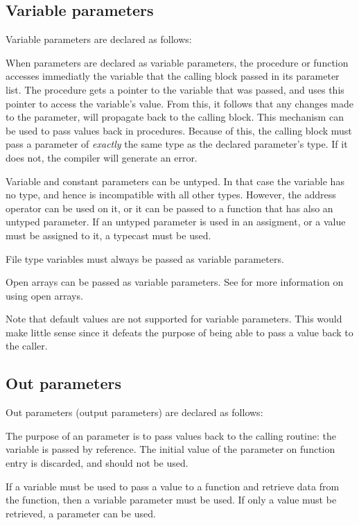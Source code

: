 \subsection{Variable parameters}
\label{se:varparams}
Variable parameters are declared as follows:

When parameters are declared as variable parameters, the procedure or
function accesses immediatly the variable that the calling block passed in
its parameter list. The procedure gets a pointer to the variable that was
passed, and uses this pointer to access the variable's value.
From this, it follows that any changes made to the parameter, will
propagate back to the calling block. This mechanism can be used to pass
values back in procedures.
Because of this, the calling block must pass a parameter of {\em exactly}
the same type as the declared parameter's type. If it does not, the compiler
will generate an error.

Variable and constant parameters can be untyped. In that case the variable has no type,
and hence is incompatible with all other types. However, the address operator
can be used on it, or it can be passed to a function that has also an
untyped parameter. If an untyped parameter is used in an assigment,
or a value must be assigned to it, a typecast must be used.

File type variables must always be passed as variable parameters.

Open arrays can be passed as variable parameters. See  for
more information on using open arrays.

Note that default values are not supported for variable parameters. This
would make little sense since it defeats the purpose of being able to pass a
value back to the caller.

\subsection{Out parameters}
\label{se:outparams}
Out parameters  (output parameters) are declared as follows:

The purpose of an  parameter is to pass values back to the calling
routine: the variable is passed by reference. The initial value of the 
parameter on function entry is discarded, and should not be used.

If a variable must be used to pass a value to a function and retrieve data
from the function, then a variable parameter must be used. If only a value
must be retrieved, a  parameter can be used.

